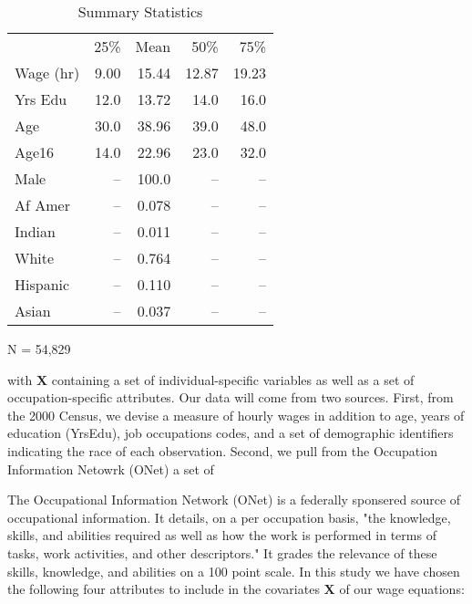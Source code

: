 \documentclass[12pt]{article}
\begin{document}
\begin{table} \centering
  \caption{Summary Statistics}
  \begin{threeparttable}
    \begin{tabular}[l]{l r r r r}
  \cmidrule{1-5}

              & 25\%   & Mean & 50\% & 75\%   \\
  \cmidrule{1-5}
  Wage (hr)   & 9.00  & 15.44 & 12.87  & 19.23\\
  Yrs Edu     & 12.0  & 13.72 & 14.0   & 16.0 \\
  Age         & 30.0  & 38.96 & 39.0   & 48.0 \\
  Age16       & 14.0  & 22.96 & 23.0   & 32.0 \\
  Male        & --    & 100.0 & --     & --   \\
  Af Amer     & --    & 0.078 & --     & --   \\
  Indian      & --    & 0.011 & --     & --   \\
  White       & --    & 0.764 & --     & --   \\
  Hispanic    & --    & 0.110 & --     & --   \\
  Asian       & --    & 0.037 & --     & --   \\

  \hline
    \end{tabular}
    \begin{tablenotes}
      \item{\footnotesize N = 54,829}
    \end{tablenotes} \label{tbl:census_cov_summary}
  \end{threeparttable}
\end{table}

with $\boldsymbol{X}$ containing a set of individual-specific 
variables as well as a set of occupation-specific attributes. 
Our data will come from two sources. First, from the 2000 Census,
we devise a measure of hourly wages in addition to age,
years of education (YrsEdu), job occupations codes, 
and a set of demographic identifiers indicating the race of each observation.
Second, we pull from the Occupation Information Netowrk (ONet) a set of 


The Occupational Information Network (ONet) is a federally sponsered source
of occupational information. It details, on a per occupation basis, "the
knowledge, skills, and abilities required as well as how the work is
performed in terms of tasks, work activities, and other descriptors."
\cite{ONET} It grades the relevance of these skills, knowledge, and
abilities on a 100 point scale. In this study we have chosen the
following four attributes to include in the covariates $\boldsymbol{X}$
of our wage equations:
\end{document}
